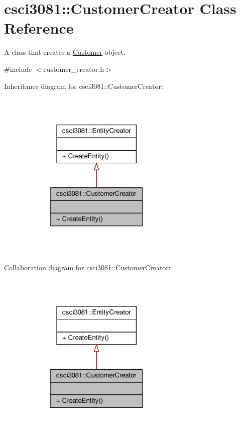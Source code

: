 \hypertarget{classcsci3081_1_1CustomerCreator}{}\section{csci3081\+:\+:Customer\+Creator Class Reference}
\label{classcsci3081_1_1CustomerCreator}


A class that creates a \hyperlink{classcsci3081_1_1Customer}{Customer} object.  




{\ttfamily \#include $<$customer\+\_\+creator.\+h$>$}



Inheritance diagram for csci3081\+:\+:Customer\+Creator\+:\nopagebreak
\begin{figure}[H]
\begin{center}
\leavevmode
\includegraphics[width=217pt]{classcsci3081_1_1CustomerCreator__inherit__graph}
\end{center}
\end{figure}


Collaboration diagram for csci3081\+:\+:Customer\+Creator\+:\nopagebreak
\begin{figure}[H]
\begin{center}
\leavevmode
\includegraphics[width=217pt]{classcsci3081_1_1CustomerCreator__coll__graph}
\end{center}
\end{figure}
